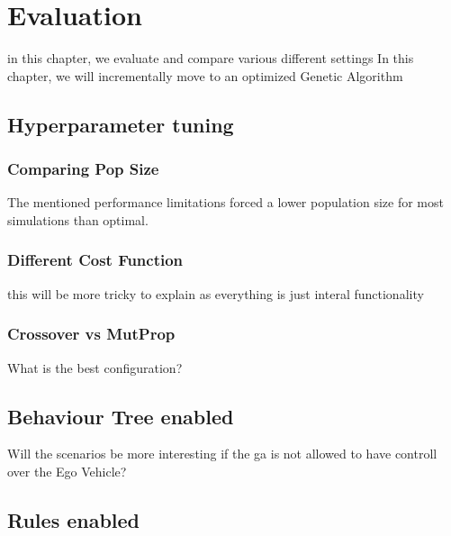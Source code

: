 \chapter{Evaluation}
\label{chap:evaluation}
in this chapter, we evaluate and compare various different settings
In this chapter, we will incrementally move to an optimized Genetic Algorithm


\section{Hyperparameter tuning}
\subsection{Comparing Pop Size}
The mentioned performance limitations forced a lower population size for most simulations than optimal.

\subsection{Different Cost Function}
this will be more tricky to explain as everything is just interal functionality

\subsection{Crossover vs MutProp}
What is the best configuration?

\section{Behaviour Tree enabled}
Will the scenarios be more interesting if the ga is not allowed to have controll over the Ego Vehicle?

\section{Rules enabled}
